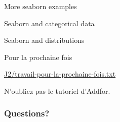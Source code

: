 \begin{frame}{More seaborn examples}

\end{frame}

\begin{frame}{Seaborn and categorical data}

\end{frame}

\begin{frame}{Seaborn and distributions}
\end{frame}

\begin{frame}{Pour la prochaine fois}

  \centerline{\url{J2/travail-pour-la-prochaine-fois.txt}}

  \bigskip
  \centerline{N'oubliez pas le tutoriel d'Addfor.}
\end{frame}


\begin{frame}
  \frametitle{Questions?}
\end{frame}


